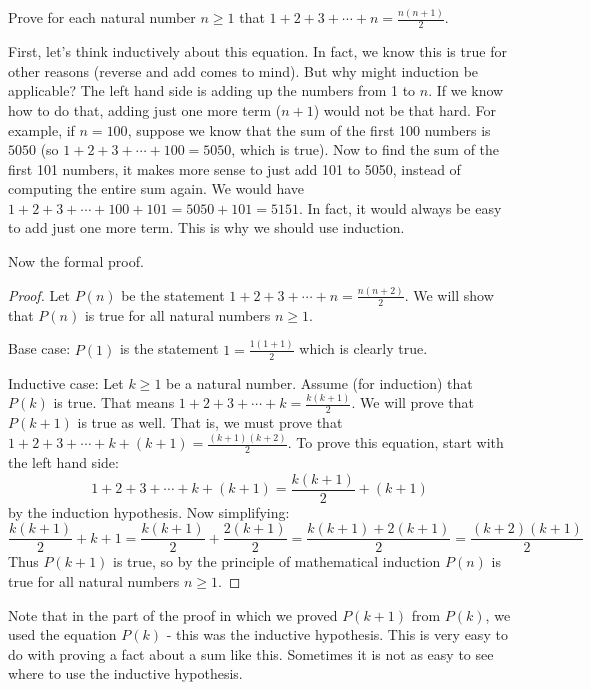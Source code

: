 \documentclass[12pt]{article}
\begin{document}
\begin{example}
  Prove for each natural number $n \ge 1$ that $1 + 2 + 3 + \cdots + n = \frac{n(n+1)}{2}$.
  
  \begin{solution}
	First, let's think inductively about this equation.  In fact, we know this is true for other reasons (reverse and add comes to mind).  But why might induction be applicable?  The left hand side is adding up the numbers from 1 to $n$.  If we know how to do that, adding just one more term ($n+1$) would not be that hard.  For example, if $n = 100$, suppose we know that the sum of the first 100 numbers is $5050$ (so $1 + 2 + 3 + \cdots + 100 = 5050$, which is true).  Now to find the sum of the first 101 numbers, it makes more sense to just add 101 to 5050, instead of computing the entire sum again.  We would have $1 + 2 + 3 + \cdots + 100 + 101 = 5050 + 101 = 5151$.  In fact, it would always be easy to add just one more term.  This is why we should use induction.  
	
	Now the formal proof.
  \begin{proof}
    Let $P(n)$ be the statement $1 + 2 + 3 + \cdots + n = \frac{n(n+2)}{2}$.  We will show that $P(n)$ is true for all natural numbers $n \ge 1$.
    
    Base case: $P(1)$ is the statement $1 = \frac{1(1+1)}{2}$ which is clearly true.
    
    Inductive case: Let $k \ge 1$ be a natural number.  Assume (for induction) that $P(k)$ is true.  That means $1 + 2 + 3 + \cdots + k = \frac{k(k+1)}{2}$.  We will prove that $P(k+1)$ is true as well.  That is, we must prove that $1 + 2 + 3 + \cdots + k + (k+1) = \frac{(k+1)(k+2)}{2}$.  To prove this equation, start with the left hand side:
    \[1 + 2 + 3 + \cdots + k + (k+1) = \frac{k(k+1)}{2} + (k+1)\]
    by the induction hypothesis.  Now simplifying:
    \[\frac{k(k+1)}{2} + k+1 = \frac{k(k+1)}{2} + \frac{2(k+1)}{2} = \frac{k(k+1) + 2(k+1)}{2} = \frac{(k+2)(k+1)}{2}\]
    Thus $P(k+1)$ is true, so by the principle of mathematical induction $P(n)$ is true for all natural numbers $n \ge 1$.
  \end{proof}
  
    \end{solution}
\end{example}

 Note that in the part of the proof in which we proved $P(k+1)$ from $P(k)$, we used the equation $P(k)$ - this was the inductive hypothesis.  This is very easy to do with proving a fact about a sum like this.  Sometimes it is not as easy to see where to use the inductive hypothesis.
 
\end{document}
